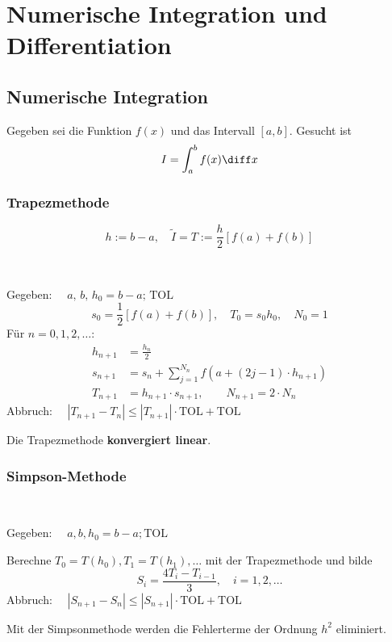 \section{Numerische Integration und Differentiation} 
	\subsection{Numerische Integration} Gegeben sei die Funktion $f(x)$ und das Intervall $[a,b]$. Gesucht ist
		\[
			I = \int_a^b f(x) \diff x
		\]
		
		\subsubsection{Trapezmethode}
			\[ 
				h:= b-a, \quad \tilde I = T:=\frac{h}{2} [ f(a) + f(b) ]
			\]

			\begin{algo} ~
				
				Gegeben: $\quad a,\, b,\, h_0 = b-a;\, \mathrm{TOL}$
				\[
					s_0 = \frac{1}{2}\left[ f(a) + f(b)\right], \quad T_0 = s_0 h_0, \quad N_0 =1
				\]
				Für $n=0,1,2,\dots$:
				\begin{align*}
					h_{n+1} &= \frac{h_n}{2} \\
					s_{n+1} &= s_n + \sum\limits_{j=1}^{N_n}f\left( a+(2j-1)\cdot h_{n+1}\right) \\
					T_{n+1} &= h_{n+1}\cdot s_{n+1}, \qquad N_{n+1}=2\cdot N_n
				\end{align*}
				Abbruch: $\quad |T_{n+1}-T_n|\leq |T_{n+1}|\cdot \mathrm{TOL} + \mathrm{TOL}$
				
				Die Trapezmethode \textbf{konvergiert linear}. 
			\end{algo}
		
		\subsubsection{Simpson-Methode}
			\begin{algo}~
				
				Gegeben: $\quad a, b, h_0 = b-a ; \mathrm{TOL}$
				
				Berechne $T_0=T(h_0), T_1=T(h_1), \dots$ mit der Trapezmethode und bilde
				\[
					S_i = \frac{4T_i-T_{i-1}}{3}, \quad i=1,2,\dots
				\]
				Abbruch: $\quad |S_{n+1}-S_n|\leq |S_{n+1}|\cdot \mathrm{TOL} + \mathrm{TOL}$

				Mit der Simpsonmethode werden die Fehlerterme der Ordnung $h^2$ eliminiert.
			\end{algo}
			
